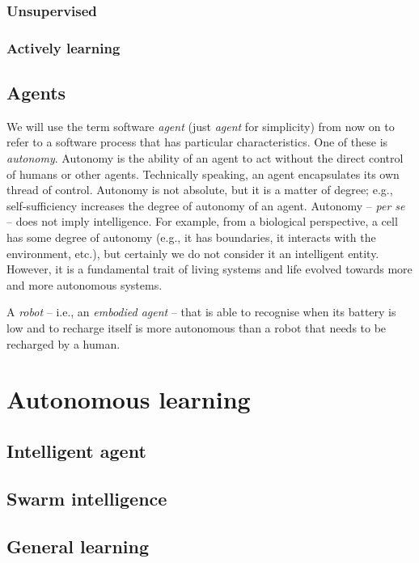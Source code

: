 \subsubsection{Unsupervised}\label{subsubsec:unsupervised}

\subsubsection{}\label{subsubsec:rl}

\subsubsection{Actively learning}\label{subsubsec:actively-learning}

\subsection{Agents}\label{subsec:agents}
%
We will use the term software \emph{agent} (just \emph{agent} for simplicity) from now on to refer to a software process that has particular characteristics.
%
One of these is \emph{autonomy}.
%
Autonomy is the ability of an agent to act without the direct control of humans or other agents.
%
Technically speaking, an agent encapsulates its own thread of control.
%
Autonomy is not absolute, but it is a matter of degree; e.g., self-sufficiency increases the degree of autonomy of an agent.
%
Autonomy -- \emph{per se} -- does not imply intelligence.
%
For example, from a biological perspective, a cell has some degree of autonomy (e.g., it has boundaries, it interacts with the environment, etc.), but certainly we do not consider it an intelligent entity.
%
However, it is a fundamental trait of living systems and life evolved towards more and more autonomous systems.


A \emph{robot} -- i.e., an \emph{embodied agent} -- that is able to recognise when its battery is low and to recharge itself is more autonomous than a robot that needs to be recharged by a human.


\section{Autonomous learning}\label{sec:autonomous-learning}

\subsection{Intelligent agent}\label{subsec:intelligent-agent}

\subsection{}\label{subsec:mas}

\subsection{Swarm intelligence}\label{subsec:swarm-intelligence}


\subsection{General learning}\label{subsec:general-learning}
